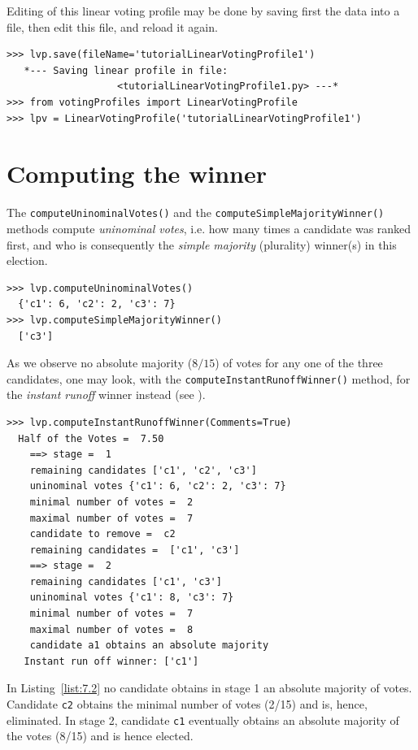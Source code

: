 Editing of this linear voting profile may be done by saving first the data into a file, then edit this file, and reload it again.
\begin{lstlisting}
>>> lvp.save(fileName='tutorialLinearVotingProfile1')
   *--- Saving linear profile in file:
                   <tutorialLinearVotingProfile1.py> ---*
>>> from votingProfiles import LinearVotingProfile
>>> lpv = LinearVotingProfile('tutorialLinearVotingProfile1')
\end{lstlisting}

\section{Computing the winner}
\label{sec:7.2}

The \texttt{computeUninominalVotes()} and the \texttt{computeSimpleMajority\-Winner()} methods compute \emph{uninominal votes}, i.e. how many times a candidate was ranked first, and who is consequently the \emph{simple majority} (plurality) winner(s) in this election.
\begin{lstlisting}
>>> lvp.computeUninominalVotes()
  {'c1': 6, 'c2': 2, 'c3': 7}
>>> lvp.computeSimpleMajorityWinner()
  ['c3']
\end{lstlisting}

As we observe no absolute majority ($8/15$) of votes for any one of the three candidates, one may look, with the \texttt{computeInstantRunoffWinner()} method, for the \emph{instant runoff} winner instead (see \citet{ADT-L2}).
\begin{lstlisting}[caption={Example Instant Run Off Winner},label=list:7.2]
>>> lvp.computeInstantRunoffWinner(Comments=True)
  Half of the Votes =  7.50
    ==> stage =  1
	remaining candidates ['c1', 'c2', 'c3']
	uninominal votes {'c1': 6, 'c2': 2, 'c3': 7}
	minimal number of votes =  2
	maximal number of votes =  7
	candidate to remove =  c2
	remaining candidates =  ['c1', 'c3']
    ==> stage =  2
	remaining candidates ['c1', 'c3']
	uninominal votes {'c1': 8, 'c3': 7}
	minimal number of votes =  7
	maximal number of votes =  8
	candidate a1 obtains an absolute majority
   Instant run off winner: ['c1']
 \end{lstlisting}

In Listing~\vref{list:7.2} no candidate obtains in stage 1 an absolute majority of votes. Candidate \texttt{c2} obtains the minimal number of votes (2/15) and is, hence, eliminated. In stage 2, candidate \texttt{c1} eventually obtains an absolute majority of the votes (8/15) and is hence elected.

